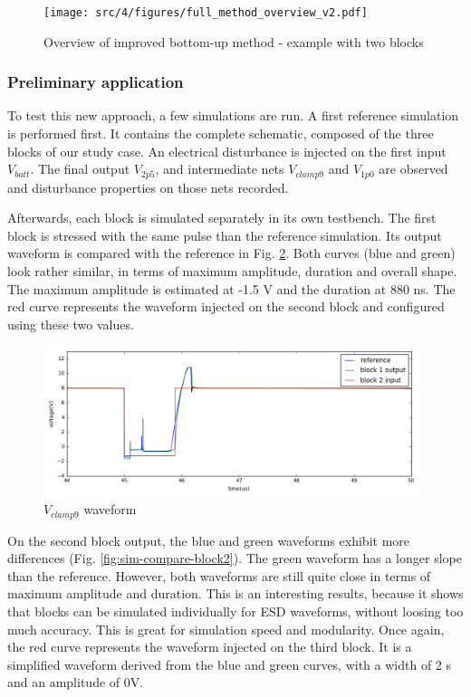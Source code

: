 \begin{figure}[!hp]
  \centering
  \texttt{[image: src/4/figures/full\_method\_overview\_v2.pdf]}
  \caption{Overview of improved bottom-up method - example with two blocks}
  \label{fig:full-method-v2}
\end{figure}

\subsubsection{Preliminary application}
To test this new approach, a few simulations are run.
A first reference simulation is performed first.
It contains the complete schematic, composed of the three blocks of our study case.
An electrical disturbance is injected on the first input $V_{batt}$.
The final output $V_{2p5}$, and intermediate nets $V_{clamp9}$ and $V_{1p0}$ are observed and disturbance properties on those nets recorded.


Afterwards, each block is simulated separately in its own testbench.
The first block is stressed with the same pulse than the reference simulation.
Its output waveform is compared with the reference in Fig. \ref{fig:sim-compare-block1}.
Both curves (blue and green) look rather similar, in terms of maximum amplitude, duration and overall shape.
The maximum amplitude is estimated at -1.5 V and the duration at 880 ns.
The red curve represents the waveform injected on the second block and configured using these two values.

\begin{figure}[!h]
  \centering
  \includegraphics[width=0.98\textwidth]{src/4/figures/simulation_comparison_block1.png}
  \caption{$V_{clamp9}$ waveform}
  \label{fig:sim-compare-block1}
\end{figure}

On the second block output, the blue and green waveforms exhibit more differences (Fig. \ref{fig:sim-compare-block2}).
The green waveform has a longer slope than the reference.
However, both waveforms are still quite close in terms of maximum amplitude and duration.
This is an interesting results, because it shows that blocks can be simulated individually for ESD waveforms, without loosing too much accuracy.
This is great for simulation speed and modularity.
Once again, the red curve represents the waveform injected on the third block.
It is a simplified waveform derived from the blue and green curves, with a width of 2 \textmugreek{}s and an amplitude of 0V.

